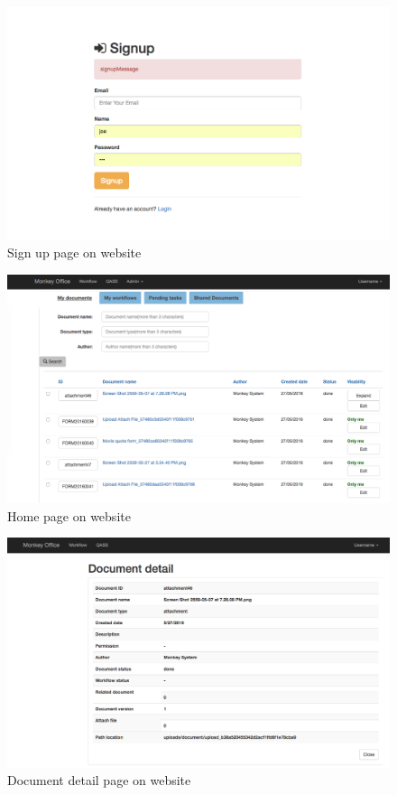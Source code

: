 \begin{figure}[h!]

	\centering
	\includegraphics[scale=0.4]{res/Screen_Shot3}
	\caption{Sign up page on website}
	\label{fig:screenshot_signup}
\end{figure}



\begin{figure}[h!]

	\centering
	\includegraphics[scale=0.3]{res/home_page}
	\caption{Home page on website}
	\label{fig:screenshot_home}
\end{figure}

\begin{figure}[h!]

	\centering
	\includegraphics[scale=0.3]{res/doc_detail_page}
	\caption{Document detail page on website}
	\label{fig:screenshot_docdetail}
\end{figure}


